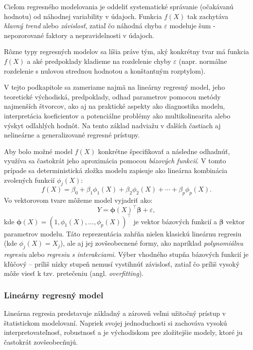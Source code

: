 Cieľom regresného modelovania je oddeliť systematické správanie (očakávanú hodnotu) od náhodnej variability v údajoch. Funkcia $f(X)$ tak zachytáva \textit{hlavný trend} alebo \textit{závislosť}, zatiaľ čo náhodná chyba $\varepsilon$ modeluje šum - nepozorované faktory a nepravidelnosti v údajoch.

Rôzne typy regresných modelov sa líšia práve tým, aký konkrétny tvar má funkcia $f(X)$ a aké predpoklady kladieme na rozdelenie chyby $\varepsilon$ (napr. normálne rozdelenie s nulovou strednou hodnotou a konštantným rozptylom).

V tejto podkapitole sa zameriame najmä na lineárny regresný model, jeho teoretické východiská, predpoklady, odhad parametrov pomocou metódy najmenších štvorcov, ako aj na praktické aspekty ako diagnostika modelu, interpretácia koeficientov a potenciálne problémy ako multikolinearita alebo výskyt odľahlých hodnôt. Na tento základ nadviažu v ďalších častiach aj nelineárne a generalizované regresné prístupy.

\noindent
Aby bolo možné model $f(X)$ konkrétne špecifikovať a následne odhadnúť, využíva sa častokrát jeho aproximácia pomocou \textit{bázových funkcií}. V tomto prípade sa deterministická zložka modelu zapisuje ako lineárna kombinácia zvolených funkcií $\phi_j(X)$:
\begin{equation}
f(X) = \beta_0 + \beta_1 \phi_1(X) + \beta_2 \phi_2(X) + \cdots + \beta_p \phi_p(X).
\end{equation}
Vo vektorovom tvare môžeme model vyjadriť ako:
\begin{equation}
Y = \boldsymbol{\phi}(X)^\top \boldsymbol{\beta} + \varepsilon,
\end{equation}
kde $\boldsymbol{\phi}(X) = (1, \phi_1(X), \ldots, \phi_p(X))^\top$ je vektor bázových funkcií a $\boldsymbol{\beta}$ vektor parametrov modelu. Táto reprezentácia zahŕňa nielen klasickú lineárnu regresiu (kde $\phi_j(X) = X_j$), ale aj jej zovšeobecnené formy, ako napríklad \textit{polynomiálnu regresiu} alebo \textit{regresiu s interakciami}. Výber vhodného stupňa bázových funkcií je kľúčový – príliš nízky stupeň nemusí vystihnúť závislosť, zatiaľ čo príliš vysoký môže viesť k tzv. pretečeniu (angl. \textit{overfitting}).

\subsubsection{Lineárny regresný model}
\label{subsec:linear_regression}

Lineárna regresia predstavuje základný a zároveň veľmi užitočný prístup v štatistickom modelovaní. Napriek svojej jednoduchosti si zachováva vysokú interpretovateľnosť, robustnosť a je východiskom pre zložitejšie modely, ktoré ju častokrát zovšeobecňujú.

